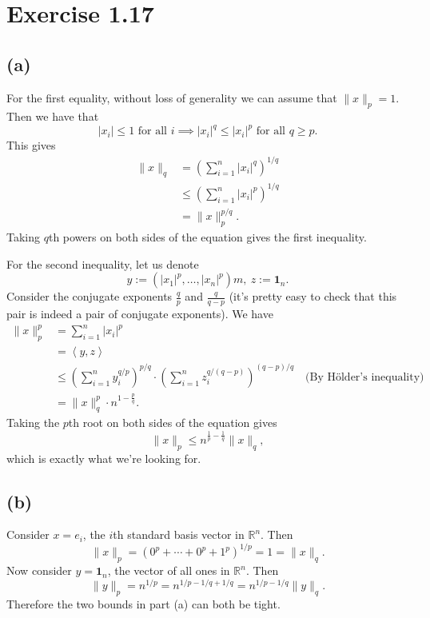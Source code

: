 \newpage
\section*{Exercise 1.17}
\subsection*{(a)}
For the first equality, without loss of generality we can assume that $\lVert x \rVert_{p} = 1$. Then we have 
that 
\[ |x_i| \leq 1 \text{ for all } i \implies |x_i|^q \leq |x_i|^p \text{ for all } q \geq p. \]
This gives 
\begin{align*}
	\lVert x \rVert_{q} 
	&= \left( \sum_{i = 1}^{n} |x_i|^q \right)^{1/q} \\
	&\leq \left( \sum_{i = 1}^{n} |x_i|^p \right)^{1/q} \\
	&= \lVert x \rVert_{p}^{p/q}.
\end{align*}
Taking $q$th powers on both sides of the equation gives the first inequality.

For the second inequality, let us denote 
\[ y := (|x_1|^p, \dots, |x_n|^p)m, \ z := \mathbf{1}_{n}. \]
Consider the conjugate exponents $\frac{q}{p}$ and $\frac{q}{q - p}$ (it's pretty easy to check that this 
pair is indeed a pair of conjugate exponents). We have
\begin{align*}
	\lVert x \rVert_{p}^p 
	&= \sum_{i = 1}^{n} |x_i|^p \\
	&= \left\langle y, z \right\rangle \\
	&\leq \left( \sum_{i = 1}^{n} y_i^{q/p} \right)^{p/q} \cdot 
	\left( \sum_{i = 1}^{n} z_i^{q / (q - p)} \right)^{(q - p)/q} \quad \text{(By Hölder's inequality)} \\
	&= \lVert x \rVert_{q}^p \cdot n^{1 - \frac{p}{q}}.
\end{align*}
Taking the $p$th root on both sides of the equation gives 
\[ \lVert x \rVert_{p} \leq n^{\frac{1}{p} - \frac{1}{q}} \lVert x \rVert_{q}, \]
which is exactly what we're looking for.

\subsection*{(b)}
Consider $x = e_i$, the $i$th standard basis vector in $\mathbb{R}^n$. Then 
\[ \lVert x \rVert_{p} = (0^p + \cdots + 0^p + 1^p)^{1/p} = 1 = \lVert x \rVert_{q}. \]
Now consider $y = \mathbf{1}_n$, the vector of all ones in $\mathbb{R}^n$. Then 
\[ \lVert y \rVert_{p} = n^{1/p} = n^{1/p-1/q+1/q} = n^{1/p-1/q}\lVert y \rVert_{q}. \]
Therefore the two bounds in part (a) can both be tight.


